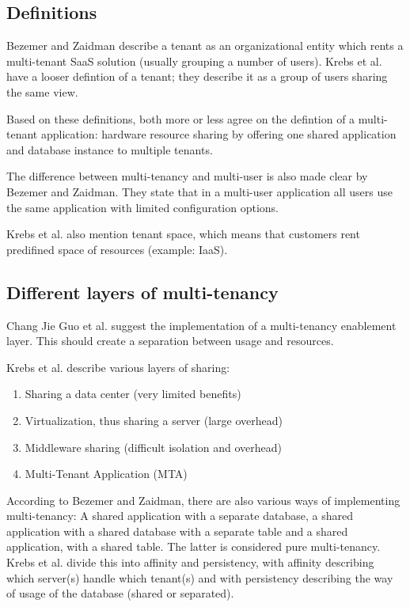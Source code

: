 
\subsection{Definitions}

Bezemer and Zaidman\cite{bezemer2010multi} describe a tenant as an organizational entity which rents a multi-tenant SaaS solution (usually grouping a number of users). Krebs et al.\cite{krebs2012architecture} have a looser defintion of a tenant; they describe it as a group of users sharing the same view.

Based on these definitions, both more or less agree on the defintion of a multi-tenant application: hardware resource sharing by offering one shared application and database instance to multiple tenants.

The difference between multi-tenancy and multi-user is also made clear by Bezemer and Zaidman. They state that in a multi-user application all users use the same application with limited configuration options. %

Krebs et al. also mention tenant space, which means that customers rent predifined space of resources (example: IaaS).

\subsection{Different layers of multi-tenancy}

Chang Jie Guo et al. suggest the implementation of a multi-tenancy enablement layer. This should create a separation between usage and resources. %


Krebs et al.\cite{krebs2012architecture} describe various layers of sharing:

\begin{enumerate}
\item Sharing a data center (very limited benefits)
\item Virtualization, thus sharing a server (large overhead)
\item Middleware sharing (difficult isolation and overhead)
\item Multi-Tenant Application (MTA)
\end{enumerate}

According to Bezemer and Zaidman, there are also various ways of implementing multi-tenancy: A shared application with a separate database, a shared application with a shared database with a separate table and a shared application, with a shared table. The latter is considered pure multi-tenancy. Krebs et al. divide this into affinity and persistency, with affinity describing which server(s) handle which tenant(s) and with persistency describing the way of usage of the database (shared or separated).

